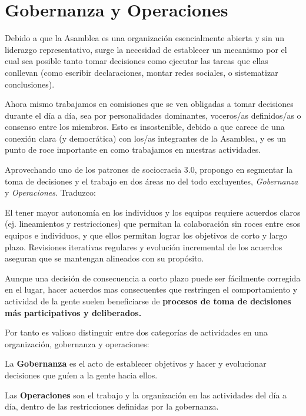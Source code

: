 \documentclass[justified]{tufte-handout} %
\begin{document}
\section{Gobernanza y Operaciones}\label{sec:gobyop}
Debido a que la Asamblea es una organización esencialmente abierta y sin un liderazgo representativo, surge la necesidad de establecer un mecanismo por el cual sea posible tanto tomar decisiones como ejecutar las tareas que ellas conllevan (como escribir declaraciones, montar redes sociales, o sistematizar conclusiones).

Ahora mismo trabajamos en comisiones que se ven obligadas a tomar decisiones durante el día a día, sea por personalidades dominantes, voceros/as definidos/as o consenso entre los miembros. Esto es insostenible, debido a que carece de una conexión clara (y democrática) con los/as integrantes de la Asamblea, y es un punto de roce importante en como trabajamos en nuestras actividades.

\pagebreak
Aprovechando uno de los patrones de sociocracia 3.0, propongo en segmentar la toma de decisiones y el trabajo en dos áreas no del todo excluyentes, \textit{Gobernanza} y \textit{Operaciones}. Traduzco\cite{gobernanzayoperaciones}:

\begin{displayquote}
	El tener mayor autonomía en los individuos y los equipos requiere acuerdos claros (ej. lineamientos y restricciones) que permitan la colaboración sin roces entre esos equipos e individuos, y que ellos permitan lograr los objetivos de corto y largo plazo. Revisiones iterativas regulares y evolución incremental de los acuerdos aseguran que se mantengan alineados con su propósito.

	Aunque una decisión de consecuencia a corto plazo puede ser fácilmente corregida en el lugar, hacer acuerdos mas consecuentes que restringen el comportamiento  y actividad de la gente suelen beneficiarse de \textbf{procesos de toma de decisiones más participativos y deliberados.}

	Por tanto es valioso distinguir entre dos categorías de actividades en una organización, gobernanza y operaciones:

	La \textbf{Gobernanza} es el acto de establecer objetivos y hacer y evolucionar decisiones que guíen a la gente hacia ellos.

	Las \textbf{Operaciones} son el trabajo y la organización en las actividades del día a día, dentro de las restricciones definidas por la gobernanza.
\end{displayquote}
\end{document}
